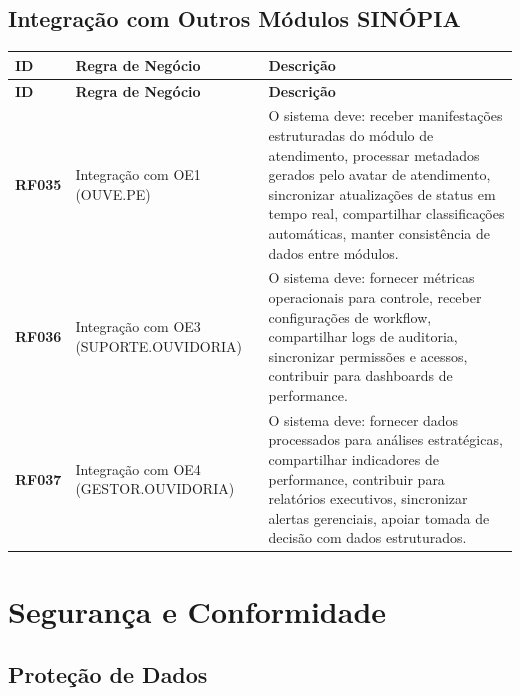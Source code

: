 \documentclass[12pt,a4paper]{article}
\newcommand{\rf}[1]{\textbf{\color{primaryblue}RF#1}}
\begin{document}
\subsection{Integração com Outros Módulos SINÓPIA}

\begin{longtable}{|p{2cm}|p{5cm}|p{8cm}|}
\hline
\textbf{ID} & \textbf{Regra de Negócio} & \textbf{Descrição} \\
\hline
\endfirsthead
\hline
\textbf{ID} & \textbf{Regra de Negócio} & \textbf{Descrição} \\
\hline
\endhead

\rf{035} & Integração com OE1 (OUVE.PE) & O sistema deve: receber manifestações estruturadas do módulo de atendimento, processar metadados gerados pelo avatar de atendimento, sincronizar atualizações de status em tempo real, compartilhar classificações automáticas, manter consistência de dados entre módulos. \\
\hline

\rf{036} & Integração com OE3 (SUPORTE.OUVIDORIA) & O sistema deve: fornecer métricas operacionais para controle, receber configurações de workflow, compartilhar logs de auditoria, sincronizar permissões e acessos, contribuir para dashboards de performance. \\
\hline

\rf{037} & Integração com OE4 (GESTOR.OUVIDORIA) & O sistema deve: fornecer dados processados para análises estratégicas, compartilhar indicadores de performance, contribuir para relatórios executivos, sincronizar alertas gerenciais, apoiar tomada de decisão com dados estruturados. \\
\hline

\end{longtable}

\section{Segurança e Conformidade}

\subsection{Proteção de Dados}
\end{document}
